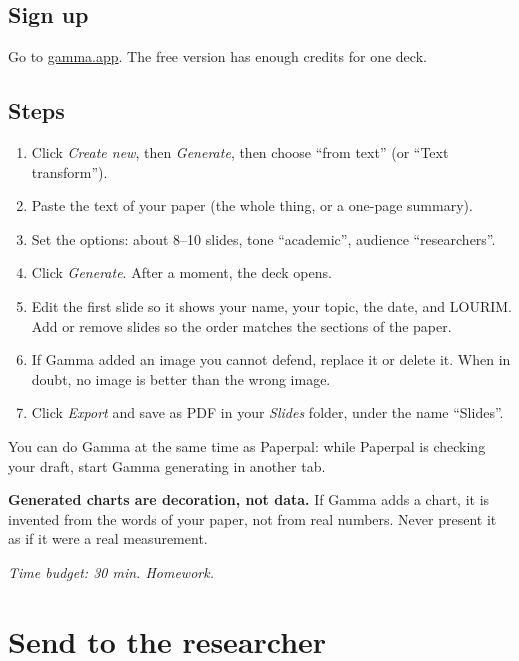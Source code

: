 \documentclass[11pt,a4paper]{article}
\begin{document}
\subsection*{Sign up}
Go to \href{https://gamma.app/}{gamma.app}. The free version has enough credits for one deck.

\subsection*{Steps}
\begin{enumerate}[leftmargin=*, itemsep=2pt]
  \item Click \emph{Create new}, then \emph{Generate}, then choose ``from text'' (or ``Text transform'').
  \item Paste the text of your paper (the whole thing, or a one-page summary).
  \item Set the options: about 8--10 slides, tone ``academic'', audience ``researchers''.
  \item Click \emph{Generate}. After a moment, the deck opens.
  \item Edit the first slide so it shows your name, your topic, the date, and LOURIM. Add or remove slides so the order matches the sections of the paper.
  \item If Gamma added an image you cannot defend, replace it or delete it. When in doubt, no image is better than the wrong image.
  \item Click \emph{Export} and save as PDF in your \emph{Slides} folder, under the name ``Slides''.
\end{enumerate}

\begin{tipbox}
You can do Gamma at the same time as Paperpal: while Paperpal is checking your draft, start Gamma generating in another tab.
\end{tipbox}

\begin{watchout}
\textbf{Generated charts are decoration, not data.} If Gamma adds a chart, it is invented from the words of your paper, not from real numbers. Never present it as if it were a real measurement.
\end{watchout}

\textit{Time budget: 30 min. Homework.}

\section{Send to the researcher}
\label{sec:send}
\end{document}

